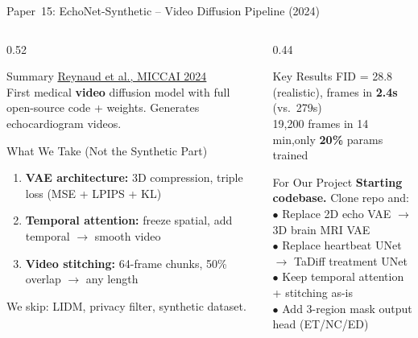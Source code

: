 \documentclass[aspectratio=169,xcolor=dvipsnames]{beamer}
\begin{document}
\begin{frame}{Paper~15: EchoNet-Synthetic -- Video Diffusion Pipeline (2024)}
    \begin{columns}
        \begin{column}{0.52\textwidth}
            \begin{block}{Summary}
                \scriptsize
                \href{https://arxiv.org/abs/2309.00997}{Reynaud et al., MICCAI 2024}\\[0.2em]
                First medical \textbf{video} diffusion model with full open-source code + weights. Generates echocardiogram videos.
            \end{block}

            \vspace{0.1em}

            \begin{block}{What We Take (Not the Synthetic Part)}
                \scriptsize
                \begin{enumerate}
                    \item \textbf{VAE architecture:} 3D compression, triple loss (MSE + LPIPS + KL)
                    \item \textbf{Temporal attention:} freeze spatial, add temporal $\to$ smooth video
                    \item \textbf{Video stitching:} 64-frame chunks, 50\% overlap $\to$ any length
                \end{enumerate}
                {\scriptsize We skip: LIDM, privacy filter, synthetic dataset.}
            \end{block}
        \end{column}

        \begin{column}{0.44\textwidth}
            \begin{block}{\small Key Results}
                \scriptsize
                FID = 28.8 (realistic), frames in \textbf{2.4s} (vs.\ 279s)\\
                19,200 frames in 14 min,\enspace only \textbf{20\%} params trained
            \end{block}

            \vspace{0.1em}

            \begin{alertblock}{For Our Project}
                \scriptsize
                \textbf{Starting codebase.} Clone repo and:\\[0.1em]
                $\bullet$ Replace 2D echo VAE $\to$ 3D brain MRI VAE\\
                $\bullet$ Replace heartbeat UNet $\to$ TaDiff treatment UNet\\
                $\bullet$ Keep temporal attention + stitching as-is\\
                $\bullet$ Add 3-region mask output head (ET/NC/ED)
            \end{alertblock}


\end{column}
\end{columns}
\end{frame}
\end{document}

